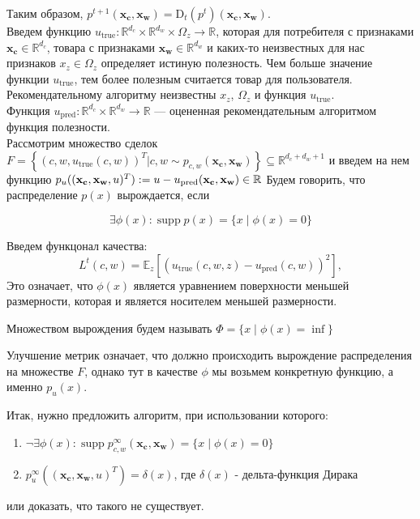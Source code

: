 \documentclass{article}
\DeclareMathOperator\supp{supp}
\begin{document}
Таким образом, $p^{t + 1}(\mathbf{x_c}, \mathbf{x_w}) = \text{D}_t(p^{t})(\mathbf{x_c}, \mathbf{x_w})$.\\
\hspace*{10px}Введем функцию $u_{\text{true}}: \mathbb{R}^{d_c} \times \mathbb{R}^{d_w} \times \Omega_z \to \mathbb{R}$, которая для потребителя с признаками $\mathbf{x_c} \in \mathbb{R}^{d_c}$, товара с признаками $\mathbf{x_w} \in \mathbb{R}^{d_w}$ и каких-то неизвестных для нас признаков $x_z \in \Omega_z$ определяет истиную полезность. Чем больше значение функции $u_{\text{true}}$, тем более полезным считается товар для пользователя. Рекомендательному алгоритму неизвестны $x_z$, $\Omega_z$ и функция $u_{\text{true}}$. \\Функция $u_{\text{pred}}: \mathbb{R}^{d_c} \times \mathbb{R}^{d_w} \to \mathbb{R}$ --- оцененная рекомендательным алгоритмом функция полезности. \\
Рассмотрим множество сделок $F =  \left\{(c, w, u_{\text{true}}(c, w))^T | c, w \sim p_{c, w}(\mathbf{x_c}, \mathbf{x_w})\right\} \subseteq \mathbb{R}^{d_c + d_w + 1}$ и введем на нем функцию $p_u((\mathbf{x_c}, \mathbf{x_w}, u)^T) := u - u_{\text{pred}}(\mathbf{x_c}, \mathbf{x_w}) \in \mathbb{R} \\$
\hspace*{10px}Будем говорить, что распределение $p(x)$ вырождается, если

$$
\exists \phi(x) : \supp p(x) = \{x \; |\; \phi(x) = 0\}
$$

Введем функцонал качества:
            $$L^t(c, w) = \mathbb{E}_z[(u_{\text{true}}(c, w, z) - u_{\text{pred}}(c, w))^2],$$
Это означает, что $\phi(x)$ является уравнением поверхности меньшей размерности, которая и является носителем меньшей размерности.

Множеством вырождения будем называть $\Phi = \{x \; |\; \phi(x) = \inf\}$

Улучшение метрик означает, что должно происходить вырождение распределения на множестве $F$, однако тут в качестве $\phi$ мы возьмем конкретную функцию, а именно $p_u(x)$.

Итак, нужно предложить алгоритм, при использовании которого:
\begin{enumerate}
    \item $\neg \exists \phi(x) : \supp p_{c, w}^{\infty}(\mathbf{x_c}, \mathbf{x_w}) = \{x \; |\; \phi(x) = 0\}$
    \item $p_u^{\infty}((\mathbf{x_c}, \mathbf{x_w}, u)^T) = \delta(x)$, где $\delta(x)$ - дельта-функция Дирака
\end{enumerate}
или доказать, что такого не существует.
\end{document}
